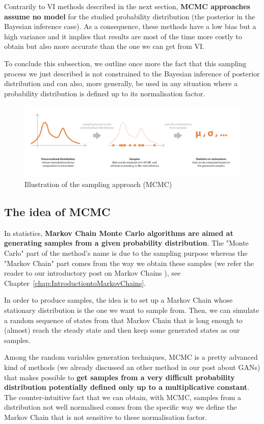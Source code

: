 Contrarily to VI methods described in the next section, \textbf{MCMC approaches assume no model} for the studied probability distribution (the posterior in the Bayesian inference case). As a consequence, these methods have a low bias but a high variance and it implies that results are most of the time more costly to obtain but also more accurate than the one we can get from VI.

To conclude this subsection, we outline once more the fact that this sampling process we just described is not constrained to the Bayesian inference of posterior distribution and can also, more generally, be used in any situation where a probability distribution is defined up to its normalisation factor.


\begin{figure}[h]
    \centering
\includegraphics[width=\textwidth]{pic/p05c07-snip03.png}
    \caption{Illustration of the sampling approach (MCMC)}
    \label{fig:p05c07-snip03}
\end{figure}


\subsection{The idea of MCMC}

In statistics, \textbf{Markov Chain Monte Carlo algorithms are aimed at generating samples from a given probability distribution}. The "Monte Carlo" part of the method's name is due to the sampling purpose whereas the "Markov Chain" part comes from the way we obtain these samples (we refer the reader to our introductory post on Markov Chains \cite{JosephRoccaMarkovChains2019}), see Chapter~\ref{chap:IntroductiontoMarkovChains}.


In order to produce samples, the idea is to set up a Markov Chain whose stationary distribution is the one we want to sample from. Then, we can simulate a random sequence of states from that Markov Chain that is long enough to (almost) reach the steady state and then keep some generated states as our samples.

Among the random variables generation techniques, MCMC is a pretty advanced kind of methods (we already discussed an other method in our post about GANs) that makes possible to \textbf{get samples from a very difficult probability distribution potentially defined only up to a multiplicative constant}. The counter-intuitive fact that we can obtain, with MCMC, samples from a distribution not well normalised comes from the specific way we define the Markov Chain that is not sensitive to these normalisation factor.


